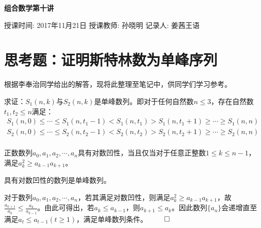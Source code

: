 ﻿\documentclass[11pt]{article}
\newtheorem{lemma}[theorem]{\hskip 1.7em 引理}
\newtheorem{definition}[theorem]{\hskip 1.7em 定义}
\renewenvironment{proof}{{\noindent\hskip 2em \bf 证明 \quad}}{\hfill$\qed$\par}
\begin{document}
    \pagestyle{fancy}
    \chead{}

    \begin{center}
        {\LARGE \bf 组合数学第十讲}\\
    \end{center}
        \begin{kaishu}
            授课时间: 2017年11月21日\quad
            授课教师: 孙晓明
            \hfill 记录人: 姜茜\quad 王语
        \end{kaishu}

    \section{思考题：证明斯特林数为单峰序列}
    根据李奉治同学给出的解答，现将此整理至笔记中，供同学们学习参考。

    求证：$S_1(n,k)$与$S_2(n,k)$是单峰数列。即对于任何自然数$n \leq 3$，存在自然数$t_1,t_2 \leq n$满足：
    \begin{align*}
        S_1(n,0) \leq \cdots \leq S_1(n,t_1-1)<S_1(n,t_1)>S_1(n,t_1+1) \geq \cdots \geq S_1(n,n)\\
        S_2(n,0) \leq \cdots \leq S_2(n,t_2-1)<S_2(n,t_2)>S_2(n,t_2+1) \geq \cdots \geq S_2(n,n)\\
    \end{align*}
    \begin{definition}[对数凹性]
        正数数列$a_0,a_1,a_2,\cdots,a_n$具有对数凹性，当且仅当对于任意正整数$1\leq k\leq n-1$，满足$a^{2}_k \geq a_{k-1}a_{k+1}$。
    \end{definition}

    \begin{lemma}
        具有对数凹性的数列是单峰数列。
    \end{lemma}
    \begin{proof}
        对于数列$a_0,a_1,a_2,\cdots,a_n$，若其满足对数凹性，则满足$a^{2}_k \geq a_{k-1}a_{k+1}$，故$\frac{a_{k+1}}{a_{k}} \leq \frac{a_{k}}{a_{k-1}}$。由此可得出，若$a_{k} \leq a_{k-1}$，则$a_{k+1} \leq a_{k}$。因此数列$\{ a_n \}$会递增直至满足$a_{t} \leq a_{t-1}(t \geq 1)$，满足单峰数列条件。
    \end{proof}
\end{document}
